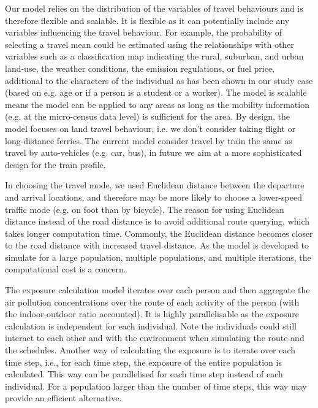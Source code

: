 \documentclass[]{article}
\begin{document}
Our model relies on the distribution of the variables of travel behaviours and is therefore flexible and scalable. It is flexible as it can potentially include any variables  influencing the travel behaviour. For example, the probability of selecting a travel mean could be estimated using the relationships with other variables such as a classification map indicating the rural, suburban, and urban land-use, the weather conditions, the emission regulations, or fuel price, additional to the characters of the individual as has been shown in our study case (based on e.g. age or if a person is a student or a worker). The model is scalable means the model can be applied to any areas as long as the mobility information (e.g. at the micro-census data level) is sufficient for the area. By design, the model focuses on land travel behaviour, i.e. we don't consider taking flight or long-distance ferries. The current model consider travel by train the same as travel by auto-vehicles (e.g. car, bus), in future we aim at a more sophisticated design for the train profile. 

  
  In choosing the travel mode, we used Euclidean distance between the departure and arrival locations, and therefore may be more likely to choose a lower-speed traffic mode (e.g. on foot than by bicycle). The reason for using Euclidean distance instead of the road distance is to avoid additional route querying, which takes longer computation time. Commonly, the Euclidean distance becomes closer to the road distance with increased travel distance. As the model is developed to simulate for a large population, multiple populations, and multiple iterations, the computational cost is a concern.
 
    
The exposure calculation model iterates over each person and then aggregate the air pollution concentrations over the route of each activity of the person (with the indoor-outdoor ratio accounted). It is highly parallelisable as the exposure calculation is independent for each individual. Note the individuals could still interact to each other and with the environment when simulating the route and the schedules. Another way of calculating the exposure is to iterate over each time step, i.e., for each time step, the exposure of the entire population is calculated. This way can be parallelised for each time step instead of each individual. For a population larger than the number of time steps, this way may provide an efficient alternative.  
\end{document}
